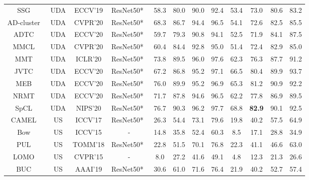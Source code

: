 \documentclass[journal]{IEEEtran}
\begin{document}
\begin{table*}
\begin{center}
\begin{tabular}{|c|c|c|c|c|c|c|c|c|c|c|c|}
					
					SSG~\cite{Fu:ICCV19} &UDA& ECCV'19&{ResNet50*~\cite{he:CVPR16resnet}}& 58.3&80.0 & 90.0 &92.4& 53.4&73.0& 80.6 &83.2\\
					AD-cluster~\cite{zhai:CVPR20} &UDA& CVPR'20&{ResNet50*~\cite{he:CVPR16resnet}}& 68.3&86.7 & 94.4 &96.5& 54.1&72.6& 82.5 &85.5\\
					ADTC~\cite{ji:ECCV20}&UDA & ECCV'20&{ResNet50*~\cite{he:CVPR16resnet}}& 59.7&79.3 & 90.8 &94.1& 52.5&71.9& 84.1 &87.5\\
					MMCL~\cite{Wang:CVPR20}&UDA & CVPR'20&{ResNet50*~\cite{he:CVPR16resnet}}& 60.4&84.4 & 92.8 &95.0& 51.4&72.4& 82.9 &85.0\\
					MMT~\cite{GE:ICLR20} &UDA&ICLR'20&{ResNet50*~\cite{he:CVPR16resnet}}& 73.8& 89.5 & 96.0 &97.6& 62.3&76.3& 87.7 &91.2\\
					JVTC~\cite{Li:ECCV20} &UDA& ECCV'20&{ResNet50*~\cite{he:CVPR16resnet}}& 67.2&86.8 & 95.2 &97.1& 66.5&80.4& 89.9 &93.7\\
					MEB~\cite{zhai:ECCV20}&UDA & ECCV'20&{ResNet50*~\cite{he:CVPR16resnet}}& 76.0&89.9 & 95.2 &96.9& 65.3 &81.2& {  90.9} &92.2\\
					NRMT~\cite{Zhao:ECCV20} &UDA& ECCV'20&{ResNet50*~\cite{he:CVPR16resnet}}& 71.7&87.8 & 94.6 &96.5& 62.2&77.8& 86.9 &89.5\\
					SpCL~\cite{Ge:NIPS20}&UDA&NIPS'20&{ResNet50*~\cite{he:CVPR16resnet}}&{76.7}& {90.3} & {96.2} &{97.7}&{68.8}&{\bf82.9}& 90.1 &{92.5}\\
					
					
	\hline\hline
CAMEL~\cite{Yu:ICCV17}&US&ICCV'17 &{ResNet50*~\cite{he:CVPR16resnet}}&26.3 &54.4&73.1&79.6 &19.8 &40.2&57.5&64.9\\
					Bow~\cite{Zheng:ICCV15}&US& ICCV'15&-& 14.8& 35.8 & 52.4& 60.3& 8.5& 17.1 & 28.8& 34.9\\
					PUL~\cite{Fan:TOMM18}&US&TOMM'18&{ResNet50*~\cite{he:CVPR16resnet}}&22.8&51.5&70.1&76.8 &22.3&41.1&46.6&63.0\\
					LOMO~\cite{Liao:CVPR15}&US &CVPR'15&-& 8.0 &27.2 & 41.6 &49.1 & 4.8 &12.3 & 21.3 &26.6\\

					
					
					BUC~\cite{Lin:AAAI19}&US& AAAI'19&{ResNet50*~\cite{he:CVPR16resnet}} &30.6 &61.0&71.6&76.4& 21.9&40.2 & 52.7& 57.4\\
				

\end{tabular}
\end{center}
\end{table*}
\end{document}
